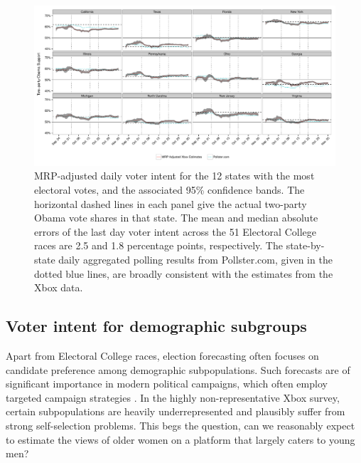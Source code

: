\documentclass[preprint,authoryear,12pt]{elsarticle}
\begin{document}
\begin{figure}
  \centering
  \includegraphics[width=15cm]{mrp_snapshots_state}
  \caption{MRP-adjusted daily voter intent for the 12 states with the most electoral
    votes, and the associated 95\% confidence bands. The horizontal dashed lines
    in each panel give the actual two-party Obama vote shares in that
    state. The mean and median absolute errors of the last day voter intent
    across the 51 Electoral College races are 2.5 and 1.8 percentage points,
    respectively. The state-by-state daily aggregated polling results from
    Pollster.com, given in the dotted blue lines, are broadly consistent with
    the estimates from the Xbox data.}
  \label{fig:state_snap}
\end{figure}


\subsection{Voter intent for demographic subgroups}
Apart from Electoral College races, election
forecasting often focuses on candidate preference among demographic
subpopulations. Such forecasts are of significant importance in modern political
campaigns, which often employ targeted campaign strategies \citep{hillygus2009persuadable}. In the
highly non-representative Xbox survey, certain
subpopulations are heavily underrepresented and plausibly suffer from
strong self-selection problems. This begs the question, can we reasonably expect to estimate
the views of older women on a platform that largely caters to young men?
\end{document}
